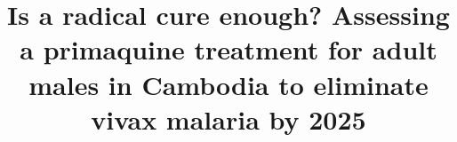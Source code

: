 \documentclass[doublespacing]{bmcart}
\begin{document}
\begin{frontmatter}

\begin{fmbox}


\title{Is a radical cure enough? Assessing a primaquine treatment for adult males in Cambodia to eliminate vivax malaria by 2025}



\end{fmbox}
\end{frontmatter}
\end{document}
